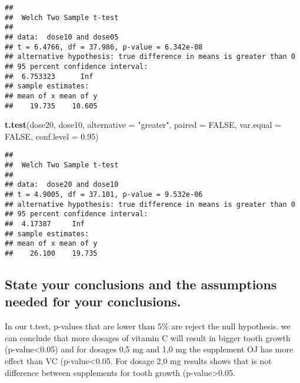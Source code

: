 \documentclass[]{article}
\newenvironment{Shaded}{\begin{snugshade}}{\end{snugshade}}
\newcommand{\DataTypeTok}[1]{\textcolor[rgb]{0.13,0.29,0.53}{#1}}
\newcommand{\FloatTok}[1]{\textcolor[rgb]{0.00,0.00,0.81}{#1}}
\newcommand{\KeywordTok}[1]{\textcolor[rgb]{0.13,0.29,0.53}{\textbf{#1}}}
\newcommand{\NormalTok}[1]{#1}
\newcommand{\OtherTok}[1]{\textcolor[rgb]{0.56,0.35,0.01}{#1}}
\newcommand{\StringTok}[1]{\textcolor[rgb]{0.31,0.60,0.02}{#1}}
\begin{document}
\begin{verbatim}
## 
##  Welch Two Sample t-test
## 
## data:  dose10 and dose05
## t = 6.4766, df = 37.986, p-value = 6.342e-08
## alternative hypothesis: true difference in means is greater than 0
## 95 percent confidence interval:
##  6.753323      Inf
## sample estimates:
## mean of x mean of y 
##    19.735    10.605
\end{verbatim}

\begin{Shaded}
\begin{Highlighting}[]
\KeywordTok{t.test}\NormalTok{(dose20, dose10, }\DataTypeTok{alternative =} \StringTok{"greater"}\NormalTok{, }\DataTypeTok{paired =} \OtherTok{FALSE}\NormalTok{, }\DataTypeTok{var.equal =} \OtherTok{FALSE}\NormalTok{, }\DataTypeTok{conf.level =} \FloatTok{0.95}\NormalTok{)}
\end{Highlighting}
\end{Shaded}

\begin{verbatim}
## 
##  Welch Two Sample t-test
## 
## data:  dose20 and dose10
## t = 4.9005, df = 37.101, p-value = 9.532e-06
## alternative hypothesis: true difference in means is greater than 0
## 95 percent confidence interval:
##  4.17387     Inf
## sample estimates:
## mean of x mean of y 
##    26.100    19.735
\end{verbatim}

\hypertarget{state-your-conclusions-and-the-assumptions-needed-for-your-conclusions.}{%
\subsection{State your conclusions and the assumptions needed for your
conclusions.}\label{state-your-conclusions-and-the-assumptions-needed-for-your-conclusions.}}

In our t.test, p-values that are lower than 5\% are reject the null
hypothesis. we can conclude that more dosages of vitamin C will result
in bigger tooth growth (p-value\textless{}0.05) and for dosages 0,5 mg
and 1,0 mg the supplement OJ has more effect than VC
(p-value\textless{}0.05. For dosage 2,0 mg results shows that is not
difference between supplements for tooth growth
(p-value\textgreater{}0.05.
\end{document}
